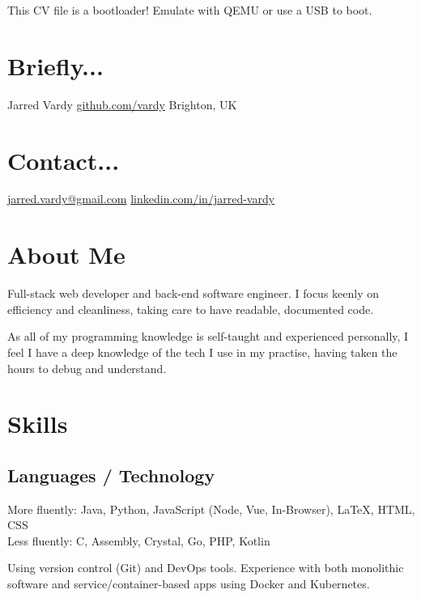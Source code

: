 \documentclass[]{jvcv}
\begin{document}
       {This CV file is a bootloader! Emulate with QEMU or use a USB to boot.}


%
\begin{aside}
	\section{Briefly...}\vspace{0.1cm}
	Jarred Vardy
	\hyperref[https://github.com/vardy/]{github.com/vardy}
	Brighton, UK
	\section{Contact...}\vspace{0.1cm}
	\hyperref[mailto:jarred.vardy@gmail.com]{jarred.vardy@gmail.com}
	\hyperref[https://linkedin.com/in/jarred-vardy]{linkedin.com/in/jarred-vardy}
\end{aside}

%
\section{About Me}
Full-stack web developer and back-end software engineer.
I focus keenly on efficiency and cleanliness, taking care to have readable, documented code.

As all of my programming knowledge is self-taught and experienced personally, I feel I have a
deep knowledge of the tech I use in my practise, having taken the hours to debug and understand.

%
\vspace{0.5cm}
\section{Skills}
\subsection{Languages / Technology}
More fluently: Java, Python, JavaScript (Node, Vue, In-Browser), LaTeX, HTML, CSS\\
Less fluently: C, Assembly, Crystal, Go, PHP, Kotlin

Using version control (Git) and DevOps tools. Experience with both monolithic software 
and service/container-based apps using Docker and Kubernetes.
\end{document}
